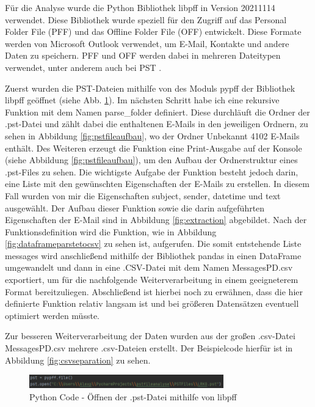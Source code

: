 Für die Analyse wurde die Python Bibliothek \glqq{}libpff\grqq{} in Version 20211114 verwendet. Diese Bibliothek wurde speziell für den Zugriff auf das Personal Folder File (PFF) und das Offline Folder File (OFF) entwickelt. Diese Formate werden von Microsoft Outlook verwendet, um E-Mail, Kontakte und andere Daten zu speichern. PFF und OFF werden dabei in mehreren Dateitypen verwendet, unter anderem auch bei PST \cite{GitHub.26.06.2022}.

Zuerst wurden die PST-Dateien mithilfe von des Moduls pypff der Bibliothek libpff geöffnet (siehe Abb. \ref{fig:fileopen}). Im nächsten Schritt habe ich eine rekursive Funktion mit dem Namen parse\_folder definiert. Diese durchläuft die Ordner der .pst-Datei und zählt dabei die enthaltenen E-Mails in den jeweiligen Ordnern, zu sehen in Abbildung \ref{fig:pstfileaufbau}, wo der Ordner Unbekannt 4102 E-Mails enthält. Des Weiteren erzeugt die Funktion eine Print-Ausgabe auf der Konsole (siehe Abbildung \ref{fig:pstfileaufbau}), um den Aufbau der Ordnerstruktur eines .pst-Files zu sehen. Die wichtigste Aufgabe der Funktion besteht jedoch darin, eine Liste mit den gewünschten Eigenschaften der E-Mails zu erstellen. In diesem Fall wurden von mir die Eigenschaften \glqq{}subject\grqq{}, \glqq{}sender\grqq{}, \glqq{}datetime\grqq{} und \glqq{}text\grqq{} ausgewählt. Der Aufbau dieser Funktion sowie die darin aufgeführten Eigenschaften der E-Mail sind in Abbildung \ref{fig:extraction} abgebildet. Nach der Funktionsdefinition wird die Funktion, wie in Abbildung \ref{fig:dataframeparstetocsv} zu sehen ist, aufgerufen. Die somit entstehende Liste \glqq{}messages\grqq{} wird anschließend mithilfe der Bibliothek pandas in einen DataFrame umgewandelt und dann in eine .CSV-Datei mit dem Namen \glqq{}MessagesPD.csv\grqq{} exportiert, um für die nachfolgende Weiterverarbeitung in einem geeigneterem Format bereitzuliegen. Abschließend ist hierbei noch zu erwähnen, dass die hier definierte Funktion relativ langsam ist und bei größeren Datensätzen eventuell optimiert werden müsste.

Zur besseren Weiterverarbeitung der Daten wurden aus der großen .csv-Datei \glqq{}MessagesPD.csv\grqq{} mehrere .csv-Dateien erstellt. Der Beispielcode hierfür ist in Abbildung \ref{fig:csvseparation} zu sehen.



\begin{figure}
    \centering
    \includegraphics[width=0.75\textwidth]{images/File_open_libpff.PNG}
    \caption{Python Code - Öffnen der .pst-Datei mithilfe von libpff} 
    \label{fig:fileopen}
\end{figure}

